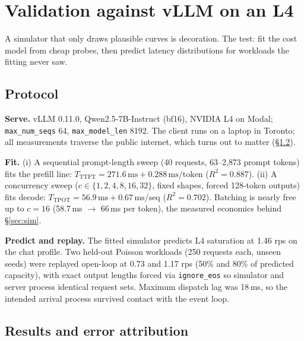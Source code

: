 \documentclass[11pt]{article}
\begin{document}
\section{Validation against vLLM on an L4}\label{sec:validation}

A simulator that only draws plausible curves is decoration. The test: fit the cost model from cheap probes, then predict latency distributions for workloads the fitting never saw.

\subsection{Protocol}

\textbf{Serve.} vLLM 0.11.0, Qwen2.5-7B-Instruct (bf16), NVIDIA L4 on Modal; \texttt{max\_num\_seqs} 64, \texttt{max\_model\_len} 8192. The client runs on a laptop in Toronto; all measurements traverse the public internet, which turns out to matter (\S\ref{sec:attribution}).

\textbf{Fit.} (i) A sequential prompt-length sweep (40 requests, 63--2{,}873 prompt tokens) fits the prefill line: $T_{\text{TTFT}} = 271.6\,\text{ms} + 0.288\,\text{ms/token}$ ($R^2 = 0.887$). (ii) A concurrency sweep ($c \in \{1,2,4,8,16,32\}$, fixed shapes, forced 128-token outputs) fits decode: $T_{\text{TPOT}} = 56.9\,\text{ms} + 0.67\,\text{ms/seq}$ ($R^2 = 0.702$). Batching is nearly free up to $c{=}16$ (58.7\,ms $\to$ 66\,ms per token), the measured economics behind \S\ref{sec:sim}.

\textbf{Predict and replay.} The fitted simulator predicts L4 saturation at 1.46 rps on the chat profile. Two held-out Poisson workloads (250 requests each, unseen seeds) were replayed open-loop at 0.73 and 1.17 rps (50\% and 80\% of predicted capacity), with exact output lengths forced via \texttt{ignore\_eos} so simulator and server process identical request sets. Maximum dispatch lag was 18\,ms, so the intended arrival process survived contact with the event loop.

\subsection{Results and error attribution}\label{sec:attribution}
\end{document}
